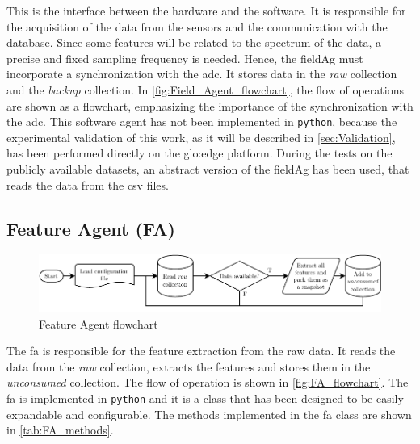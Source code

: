 This is the interface between the hardware and the software. It is responsible for the acquisition of the data from the sensors and the communication with the database. Since some features will be related to the spectrum of the data, a precise and fixed sampling frequency is needed. Hence, the \gls{fieldAg} must incorporate a synchronization with the \gls{adc}. It stores data in the \emph{raw} collection and the \emph{backup} collection. In \autoref{fig:Field_Agent_flowchart}, the flow of operations are shown as a flowchart, emphasizing the importance of the synchronization with the \gls{adc}. This software agent has not been implemented in \texttt{python}, because the experimental validation of this work, as it will be described in \autoref{sec:Validation}, has been performed directly on the \gls{glo:edge} platform. During the tests on the publicly available datasets, an abstract version of the \gls{fieldAg} has been used, that reads the data from the \gls{csv} files.


\subsection{Feature Agent (FA)}
\label{subsec:FeatureAgent}
\begin{figure}
    \centering
    \includegraphics[width=\textwidth]{images/Framework/FA_flowchart.pdf}
    \caption{Feature Agent flowchart}
    \label{fig:FA_flowchart}
\end{figure}

The \gls{fa} is responsible for the feature extraction from the raw data. It reads the data from the \emph{raw} collection, extracts the features and stores them in the \emph{unconsumed} collection. The flow of operation is shown in \autoref{fig:FA_flowchart}. The \gls{fa} is implemented in \texttt{python} and it is a class that has been designed to be easily expandable and configurable. The methods implemented in the \gls{fa} class are shown in \autoref{tab:FA_methods}.


